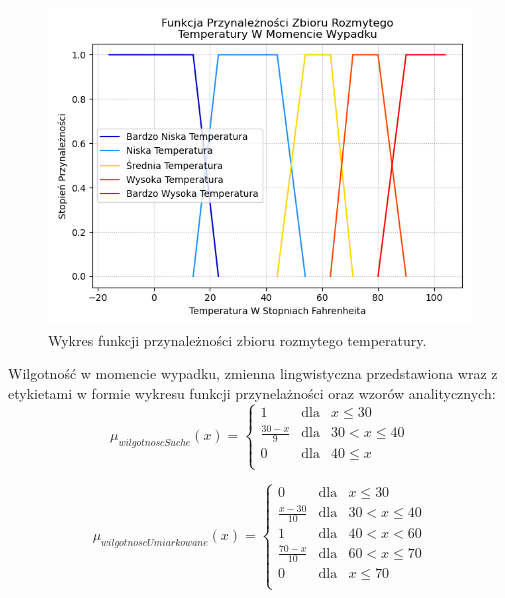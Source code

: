 \documentclass{classrep}
\begin{document}
\begin{figure}[h!]
 \centering
 \includegraphics[width=14cm]{FunkcjaPrzynaleznosciTemperatura.png}
 \vspace{-0.3cm}
 \caption{Wykres funkcji przynależności zbioru rozmytego temperatury. }
 \label{rysunek do eksperymentu 1 wariantu 1}
\end{figure}
\newpage




Wilgotność w momencie wypadku, zmienna lingwistyczna przedstawiona wraz z etykietami w formie wykresu funkcji przynelażności oraz wzorów analitycznych:
\begin{equation}
\mu _{wilgotnoscSuche}(x) =  \left\{ \begin{array}{rcl}
 1 & \mbox{dla} & x  \leq 30 \\
\frac{30 - x}{9} & \mbox{dla} & 30 < x \leq 40\\
0 & \mbox{dla} & 40 \leq x\\
\end{array}\right.
\end{equation}

\begin{equation}
\mu _{wilgotnoscUmiarkowane}(x) =  \left\{ \begin{array}{rcl}
 0 & \mbox{dla} & x  \leq 30 \\
\frac{x - 30}{10} & \mbox{dla} & 30 < x \leq 40\\
1 & \mbox{dla} & 40 < x < 60\\
\frac{70 - x}{10} & \mbox{dla} & 60 < x \leq 70\\
 0 & \mbox{dla} & x  \leq 70 \\
\end{array}\right.
\end{equation}
\end{document}

